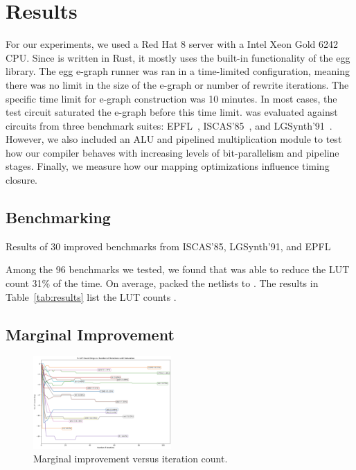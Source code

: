 \section{Results}\label{sec:results}
For our experiments, we used a Red Hat 8 server with a Intel Xeon Gold 6242
CPU. Since \shortname{} is written in Rust, it mostly uses the built-in
functionality of the egg library. The egg e-graph runner was ran in a
time-limited configuration, meaning there was no limit in the size of the
e-graph or number of rewrite iterations. The specific time limit for e-graph
construction was 10 minutes. In most cases, the test circuit saturated the
e-graph before this time limit. \shortname{} was evaluated against circuits
from three benchmark suites: EPFL~\cite{epflbench}, ISCAS'85~\cite{iscasbench},
and LGSynth'91~\cite{lgsynthbench}. However, we also included an ALU and
pipelined multiplication module to test how our compiler behaves with
increasing levels of bit-parallelism and pipeline stages. Finally, we measure
how our mapping optimizations influence timing closure.

\subsection{Benchmarking}\label{sec:results:benchmark}
\begin{table}
    \centering
    \caption{Results of 30 improved benchmarks from ISCAS'85, LGSynth'91, and EPFL}\label{tab:results}
\end{table}
Among the 96 benchmarks we tested, we found that \shortname{} was able to
reduce the LUT count 31\% of the time. On average, \shortname{} packed the
netlists to \metric{}. The results in Table~\ref{tab:results} list the LUT counts .

\subsection{Marginal Improvement}\label{sec:results:margin}
\begin{figure}
    \centering
    \includegraphics[width=0.47\textwidth]{img/improvement.png}
    \caption{Marginal improvement versus iteration count.}\label{fig:improvement}
    \Description[]{}
\end{figure}

